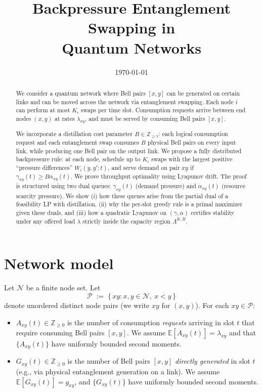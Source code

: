 \documentclass[11pt]{article}
\title{Backpressure Entanglement Swapping in \\ Quantum Networks}
\date{\today}
\newcommand{\E}{\mathbb{E}}
\newcommand{\Ncal}{\mathcal{N}}
\newcommand{\Pairs}{\mathcal{P}} %
\begin{document}
\maketitle

\begin{abstract}
We consider a quantum network where Bell pairs $[x,y]$ can be generated on certain links and can be moved across the network via entanglement swapping. Each node $i$ can perform at most $K_i$ swaps per time slot. Consumption requests arrive between end nodes $(x,y)$ at rates $\lambda_{xy}$, and must be served by consuming Bell pairs $[x,y]$.

We incorporate a distillation cost parameter $B\in\mathbb{Z}_{\ge 1}$: each logical consumption request and each entanglement swap consumes $B$ physical Bell pairs on every input link, while producing one Bell pair on the output link. We propose a fully distributed backpressure rule: at each node, schedule up to $K_i$ swaps with the largest positive ``pressure differences'' $W_i(y,y';t)$, and serve demand on pair $xy$ if $\gamma_{xy}(t)\ge B\alpha_{xy}(t)$. We prove throughput optimality using Lyapunov drift. The proof is structured using two dual queues: $\gamma_{xy}(t)$ (demand pressure) and $\alpha_{xy}(t)$ (resource scarcity pressure). We show (i) how these queues arise from the partial dual of a feasibility LP with distillation, (ii) why the per-slot greedy rule is a primal maximizer given these duals, and (iii) how a quadratic Lyapunov on $(\gamma,\alpha)$ certifies stability under any offered load $\lambda$ strictly inside the capacity region $\Lambda^{K,B}$.
\end{abstract}

\section{Network model}



Let $\Ncal$ be a finite node set. Let
\[
\Pairs \;:=\; \{\, xy : x,y\in\Ncal,\ x<y \,\}
\]
denote unordered distinct node pairs (we write $xy$ for $(x,y)$). For each $xy\in\Pairs$:

\begin{itemize}[leftmargin=2em]
\item $A_{xy}(t)\in\mathbb{Z}_{\ge 0}$ is the number of consumption \emph{requests} arriving in slot $t$ that require consuming Bell pairs $[x,y]$. We assume $\E[A_{xy}(t)]=\lambda_{xy}$ and that $\{A_{xy}(t)\}$ have uniformly bounded second moments.
\item $G_{xy}(t)\in\mathbb{Z}_{\ge 0}$ is the number of Bell pairs $[x,y]$ \emph{directly generated} in slot $t$ (e.g., via physical entanglement generation on a link). We assume $\E[G_{xy}(t)]=g_{xy}$, and $\{G_{xy}(t)\}$ have uniformly bounded second moments.
\end{itemize}
\end{document}
